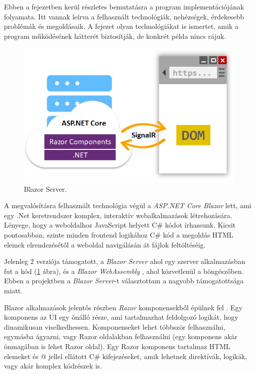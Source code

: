 
Ebben a fejezetben kerül részletes bemutatásra a program implementációjának folyamata. Itt vannak leírva a felhasznált technológiák, nehézségek, érdekesebb problémák és megoldásaik. A fejezet olyan technológiákat is ismertet, amik a program működésének hátterét biztosítják, de konkrét példa nincs rájuk.

\begin{figure}[h]
\centering
\includegraphics[scale=0.5]{images/blazor.jpg}
\caption{Blazor Server. \cite{blazor}}
\label{fig:blazor}
\end{figure}

A megvalósításra felhasznált technológia végül a \textit{ASP.NET Core Blazor}  \cite{blazor} lett, ami egy .Net \cite{dotnet} keretrendszer komplex, interaktív webalkalmazások létrehozására. Lényege, hogy a weboldalhoz  JavaScript \cite{js} helyett C\# \cite{csharp} kódot írhassunk. Kicsit pontosabban, szinte minden frontend logikához C\# kód a megoldás HTML elemek elrendezésétől a weboldal navigálásán át fájlok feltöltéséig.

Jelenleg 2 verziója támogatott, a \textit{Blazor Server}  \cite{blazor_h} ahol egy szerver alkalmazásban fut a kód (\ref{fig:blazor} ábra), és a \textit{Blazor WebAssembly} \cite{blazor_h}, ahol közvetlenül a böngészőben. Ebben a projektben a \textit{Blazor Server}-t választottam a nagyobb támogatottsága miatt.

Blazor alkalmazások jelentős részben \textit{Razor} komponensekből épülnek fel \cite{razor}. Egy komponens az UI egy önálló része, ami tartalmazhat feldolgozó logikát, hogy dinamikusan viselkedhessen. Komponenseket lehet többször felhasználni, egymásba ágyazni, vagy Razor oldalakban felhasználni (egy komponens akár önmagában is lehet Razor oldal). Egy Razor komponens tartalmaz HTML elemeket és @ jellel ellátott C\# kifejezéseket, amik lehetnek direktívák, logikák, vagy akár komplex kódrészek is.

